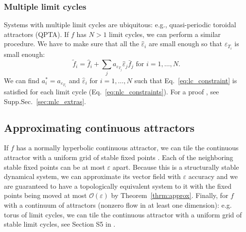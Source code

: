\documentclass{article}
\theoremstyle{definition} \newtheorem{definition}{Definition}
\theoremstyle{remark} \newtheorem{remark}{Remark}
\newcounter{ct}
\begin{document}
\subsubsection{Multiple limit cycles}
Systems with multiple limit cycles are ubiquitous: e.g., quasi-periodic toroidal attractors (QPTA)\citep{Park2023a}.
%
If $f$ has $N>1$ limit cycles, we can perform a similar procedure.
We have to make sure that all the $\hat{\varepsilon}_i$ are small enough so that $\varepsilon_{T_i}$ is small enough:
\begin{equation}\label{eq:nlc_vfs}
\tilde f_i = \hat{f}_i + \sum_{j}a_{\varepsilon_{T_j}}\hat{\varepsilon}_j\bar{f}_j \text{ for } i=1,\dots, N.
\end{equation}
We can find $a_i^* = a_{\varepsilon_{T_i}}$ and $\hat\varepsilon_i$ for $i=1,\dots,N$ such that Eq.~\ref{eq:lc_constraint} is satisfied for each limit cycle (Eq.~\ref{eq:nlc_constraints}).
For a proof , see Supp.Sec.~\ref{sec:mlc_extras}.




\subsection{Approximating continuous attractors}\label{sec:ca_theorem}


If $f$ has a normally hyperbolic continuous attractor, we can tile the continuous attractor with a uniform grid of stable fixed points \citep{Sagodi2024a}.
Each of the neighboring stable fixed points can be at most $\varepsilon$ apart. %
Because this is a structurally stable dynamical system,  we can approximate its vector field with $\varepsilon$ accuracy and we are guaranteed to have a topologically equivalent system to it with the fixed points being moved at most $\mathcal{O}(\varepsilon)$ by Theorem~\ref{thrm:approx}. 
Finally, for $f$ with a continuum of attractors (nonzero flow in at least one dimension): e.g. torus of limit cycles, we can tile the continuous attractor with a uniform grid of stable limit cycles, see Section S5 in \citep{Sagodi2024a}.
\end{document}
